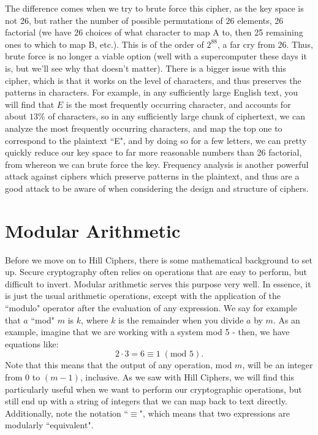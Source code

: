 \documentclass{article}
\begin{document}
\noindent The difference comes when we try to brute force this cipher, as the key space is not 26, but rather the number of possible permutations of 26 elements, 26 factorial (we have 26 choices of what character to map A to, then 25 remaining ones to which to map B, etc.). This is of the order of $2^{88}$, a far cry from 26. Thus, brute force is no longer a viable option (well with a supercomputer these days it is, but we'll see why that doesn't matter). There is a bigger issue with this cipher, which is that it works on the level of characters, and thus preserves the patterns in characters. For example, in any sufficiently large English text, you will find that $E$ is the most frequently occurring character, and accounts for about $13\%$ of characters, so in any sufficiently large chunk of ciphertext, we can analyze the most frequently occurring characters, and map the top one to correspond to the plaintext ``E", and by doing so for a few letters, we can pretty quickly reduce our key space to far more reasonable numbers than 26 factorial, from whereon we can brute force the key. Frequency analysis is another powerful attack against ciphers which preserve patterns in the plaintext, and thus are a good attack to be aware of when considering the design and structure of ciphers.

\section{Modular Arithmetic}

Before we move on to Hill Ciphers, there is some mathematical background to set up. Secure cryptography often relies on operations that are easy to perform, but difficult to invert. Modular arithmetic serves this purpose very well. In essence, it is just the usual arithmetic operations, except with the application of the ``modulo" operator after the evaluation of any expression. We say for example that $a$ ``mod" $m$ is $k$, where $k$ is the remainder when you divide $a$ by $m$. As an example, imagine that we are working with a system mod 5 - then, we have equations like:
\[
    2 \cdot 3 = 6 \equiv 1 \; (\text{mod } 5).
\]
Note that this means that the output of any operation, mod $m$, will be an integer from $0$ to $(m - 1)$, inclusive. As we saw with Hill Ciphers, we will find this particularly useful when we want to perform our cryptographic operations, but still end up with a string of integers that we can map back to text directly. Additionally, note the notation ``$\equiv$", which means that two expressions are modularly ``equivalent".
\end{document}
